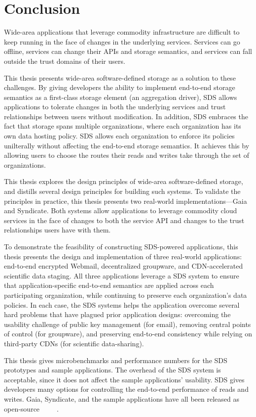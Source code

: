 \chapter{Conclusion}
\label{chap:conclusion}

Wide-area applications that leverage commodity infrastructure are difficult to
keep running in the face of changes in the underlying services.  Services can go
offline, services can change their APIs and storage semantics, and services can
fall outside the trust domains of their users.

This thesis presents wide-area software-defined storage as a solution to these
challenges.  By giving developers the ability to implement end-to-end
storage semantics as a first-class
storage element (an aggregation driver),
SDS allows applications to tolerate changes in both the underlying
services and trust relationships between users without modification.
In addition, SDS embraces the fact that storage spans multiple organizations,
where each organization has its own data hosting policy.  SDS allows each organization to enforce
its policies unilterally without affecting the end-to-end storage semantics.  It
achieves this by allowing users to choose the routes their reads and writes take
through the set of organizations.

This thesis explores the design principles of wide-area software-defined storage, and
distills several design principles for building such systems.  To validate the
principles in practice, this thesis presents two real-world
implementations---Gaia and Syndicate.  Both systems allow applications to
leverage commodity cloud services in the face of changes to both the service API
and changes to the trust relationships users have with them.

To demonstrate the feasibility of constructing SDS-powered applications, 
this thesis presents the design and implementation of three real-world applications:
end-to-end encrypted Webmail, decentralized groupware, and CDN-accelerated
scientific data staging.  All three applications leverage a SDS system to ensure
that application-specific end-to-end semantics are applied across each
participating organization, while continuing to preserve each organization's
data policies.  In each case, the SDS systems helps the application overcome several hard
problems that have plagued prior application designs:
overcoming the usability challenge of public key management (for email),
removing central points of control (for groupware), and preserving end-to-end
consistency while relying on third-party CDNs (for scientific data-sharing).

This thesis gives microbenchmarks and performance numbers for the SDS prototypes and
sample applications.  The overhead of the SDS system is acceptable,
since it does not affect the sample applications' usability.  SDS gives
developers many options for controlling the end-to-end performance of reads and writes.
Gaia, Syndicate, and the sample applications have all been released as
open-source~\cite{blockstack-core}~\cite{syndicate-storage}~\cite{syndicatemail}~\cite{blockstack-todo}~\cite{blockstack-browser}.

